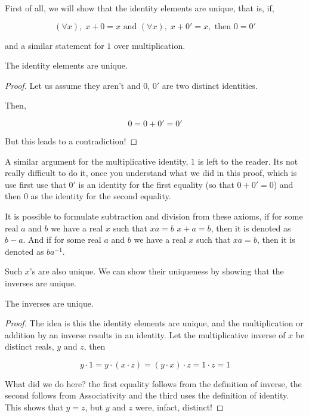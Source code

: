 First of all, we will show that the identity elements are unique, that is, if,

\begin{equation*}
    (\forall x),\; x + 0 = x \text{ and } (\forall x),\; x + 0' = x, \text{ then } 0 = 0'
\end{equation*}

and a similar statement for \(1\) over multiplication.

\begin{proposition}
    The identity elements are unique.
\end{proposition}

\begin{proof}
    Let us assume they aren't and \(0\), \(0'\) are two distinct identities.

    Then, 

    \begin{equation*}
        0 = 0 + 0' = 0'
    \end{equation*}

    But this leads to a contradiction! \lightning
\end{proof}


A similar argument for the multiplicative identity, \(1\) is left to the reader. Its 
not really difficult to do it, once you understand what we did in this proof, which is 
use first use that \(0'\) is an identity for the first equality (so that \(0 + 0' = 0\)) 
and then \(0\) as the identity for the second equality. 

It is possible to formulate subtraction and division from these axioms, if for some real \(a\) and \(b\) we have a real
\(x\) such that \(xa = b\) \(x + a = b\), then it is denoted as \(b - a\). 
And if for some real \(a\) and \(b\) we have a real \(x\) such that \(xa = b\), then it is denoted as \(ba^{-1}\). 

Such \(x\)'s are also unique. We can show their uniqueness by showing that the inverses are unique.

\begin{proposition}
    The inverses are unique.
\end{proposition}

\begin{proof}
    The idea is this the identity elements are unique, and the multiplication or addition
    by an inverse results in an identity. Let the multiplicative inverse of \(x\) be 
    distinct reals, \(y\) and \(z\), then  

    \begin{equation*}
        y \cdot 1 = y \cdot (x \cdot z) = (y \cdot x) \cdot z = 1 \cdot z = 1
    \end{equation*}

    What did we do here? the first equality follows from the definition 
    of inverse, the second follows from Associativity and the third uses the 
    definition of identity. This shows that \(y = z\), but \(y\) and \(z\) 
    were, infact, distinct! \lightning

\end{proof}


